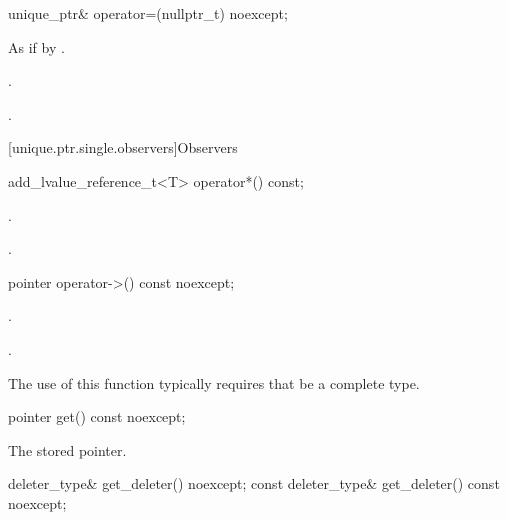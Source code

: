 %
\begin{itemdecl}
unique_ptr& operator=(nullptr_t) noexcept;
\end{itemdecl}

\begin{itemdescr}
\pnum
\effects
As if by .

\pnum
\ensures
{}.

\pnum
\returns
{}.
\end{itemdescr}

[unique.ptr.single.observers]{Observers}

%
\begin{itemdecl}
add_lvalue_reference_t<T> operator*() const;
\end{itemdecl}

\begin{itemdescr}
\pnum
\requires {}.

\pnum
\returns
{}.

\end{itemdescr}

%
\begin{itemdecl}
pointer operator->() const noexcept;
\end{itemdecl}

\begin{itemdescr}
\pnum
\requires {}.

\pnum
\returns
{}.

\pnum
\begin{note}
The use of this function typically requires that  be a complete type.
\end{note}
\end{itemdescr}

%
\begin{itemdecl}
pointer get() const noexcept;
\end{itemdecl}

\begin{itemdescr}
\pnum
\returns
The stored pointer.
\end{itemdescr}

%
\begin{itemdecl}
deleter_type& get_deleter() noexcept;
const deleter_type& get_deleter() const noexcept;
\end{itemdecl}

